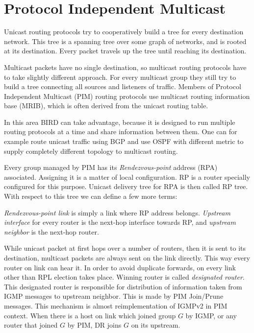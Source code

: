 \chapter{Protocol Independent Multicast}

Unicast routing protocols try to cooperatively build a tree for every
destination network. This tree is a spanning tree over some graph of networks,
and is rooted at its destination. Every packet travels up the tree until
reaching its destination.

Multicast packets have no single destination, so multicast routing protocols
have to take slightly different approach. For every multicast group they still
try to build a tree connecting all sources and listeners of traffic. Members of
Protocol Independent Multicast (PIM) routing protocols use multicast routing
information base (MRIB), which is often derived from the unicast routing table.

In this area BIRD can take advantage, because it is designed to run multiple
routing protocols at a time and share information between them. One can for
example route unicast traffic using BGP and use OSPF with different metric to
supply completely different topology to multicast routing.

Every group managed by PIM has its \emph{Rendezvous-point} address (RPA)
associated. Assigning it is a matter of local configuration. RP is a router
specially configured for this purpose. Unicast delivery tree for RPA is then
called RP tree. With respect to this tree we can define a few more terms:

\emph{Rendezvous-point link} is simply a link where RP address belongs.
\emph{Upstream interface} for every router is the next-hop interface towards
RP, and \emph{upstream neighbor} is the next-hop router.

While unicast packet at first hops over a number of routers, then it is sent to
its destination, multicast packets are always sent on the link directly. This
way every router on link can hear it. In order to avoid duplicate forwards, on
every link other than RPL election takes place. Winning router is called
\emph{designated router}. This designated router is responsible for
distribution of information taken from IGMP messages to upstream neighbor. This
is made by PIM Join/Prune messages. This mechanism is almost reimplementation
of IGMPv2 in PIM context. When there is a host on link which joined group $G$
by IGMP, or any router that joined $G$ by PIM, DR joins $G$ on its upstream.

